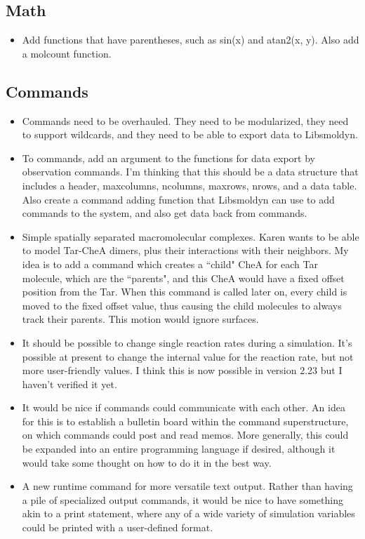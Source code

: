 \documentclass {scrbook}
\begin{document}
\subsection{Math}
\begin{itemize}
\item Add functions that have parentheses, such as sin(x) and atan2(x, y). Also add a molcount function.
\end{itemize}

\subsection{Commands}
\begin{itemize}
\item Commands need to be overhauled. They need to be modularized, they need to support wildcards, and they need to be able to export data to Libsmoldyn.
\item To commands, add an argument to the functions for data export by observation commands. I'm thinking that this should be a data structure that includes a header, maxcolumns, ncolumns, maxrows, nrows, and a data table. Also create a command adding function that Libsmoldyn can use to add commands to the system, and also get data back from commands.
\item Simple spatially separated macromolecular complexes. Karen wants to be able to model Tar-CheA dimers, plus their interactions with their neighbors. My idea is to add a command which creates a ``child" CheA for each Tar molecule, which are the ``parents", and this CheA would have a fixed offset position from the Tar. When this command is called later on, every child is moved to the fixed offset value, thus causing the child molecules to always track their parents. This motion would ignore surfaces.
\item It should be possible to change single reaction rates during a simulation. It's possible at present to change the internal value for the reaction rate, but not more user-friendly values. I think this is now possible in version 2.23 but I haven't verified it yet.
\item It would be nice if commands could communicate with each other. An idea for this is to establish a bulletin board within the command superstructure, on which commands could post and read memos. More generally, this could be expanded into an entire programming language if desired, although it would take some thought on how to do it in the best way.
\item A new runtime command for more versatile text output. Rather than having a pile of specialized output commands, it would be nice to have something akin to a print statement, where any of a wide variety of simulation variables could be printed with a user-defined format.
\end{itemize}
\end{document}
